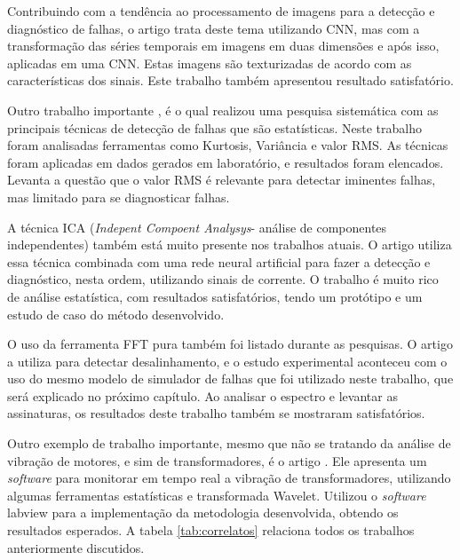 Contribuindo com a tendência ao processamento de imagens para a detecção e diagnóstico de falhas, o artigo \cite{Hatami2017} trata deste tema
utilizando CNN, mas com a transformação das séries temporais em imagens em duas dimensões e após isso, aplicadas em uma CNN. Estas imagens são
texturizadas de acordo com as características dos sinais. Este trabalho também apresentou resultado satisfatório.

Outro trabalho importante \cite{Caesarendra2017} , é o qual realizou uma pesquisa sistemática com as principais técnicas de detecção de 
falhas que são estatísticas. Neste trabalho foram analisadas ferramentas como Kurtosis, Variância e valor RMS. As técnicas foram aplicadas em 
dados gerados em laboratório, e resultados foram elencados. Levanta a questão que o valor RMS é relevante para detectar iminentes falhas, mas
limitado para se diagnosticar falhas.

A técnica ICA (\textit{Indepent Compoent Analysys}- análise de componentes independentes) também está muito presente nos trabalhos atuais. O 
artigo \cite{Garcia-Bracamonte2019} utiliza essa técnica combinada com uma rede neural artificial para fazer a detecção e diagnóstico, 
nesta ordem, utilizando sinais de corrente. O trabalho é muito rico de análise estatística, com resultados satisfatórios, tendo
um protótipo e um estudo de caso do método desenvolvido.

O uso da ferramenta FFT pura também foi listado durante as pesquisas. O artigo \cite{Azeem2019} a utiliza para detectar desalinhamento, e o
estudo experimental aconteceu com o uso do mesmo modelo de simulador de falhas que foi utilizado neste trabalho, que será explicado no próximo
capítulo. Ao analisar o espectro e levantar as assinaturas, os resultados deste trabalho também se mostraram satisfatórios. 

Outro exemplo de trabalho importante, mesmo que não se tratando da análise de vibração de motores, e sim de transformadores, é o artigo \cite{Zhang2019}.
Ele apresenta um \textit{software} para monitorar em tempo real a vibração de transformadores, utilizando algumas ferramentas estatísticas e transformada
Wavelet. Utilizou o \textit{software} labview para a implementação da metodologia desenvolvida, obtendo os resultados esperados. A tabela
\ref{tab:correlatos} relaciona todos os trabalhos anteriormente discutidos.

